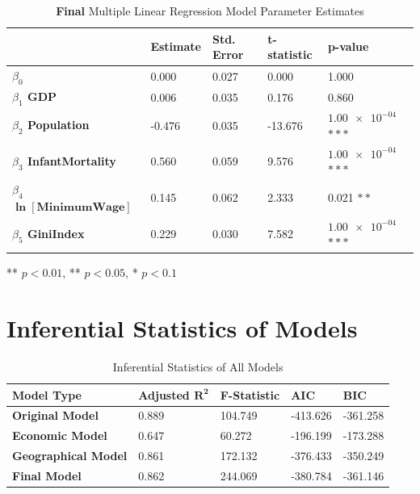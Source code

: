 \documentclass{article}
\begin{document}
\begin{appendices}
\begin{table}[H]
    \centering
        \begin{threeparttable}
            \begin{tabular}{l l l l l}
              \toprule & \textbf{Estimate} & \textbf{Std. Error} & \textbf{t-statistic} & \textbf{p-value} \\ \midrule
            \textbf{$\beta_0$} & 0.000 & 0.027 & 0.000 & 1.000 \\ 
            \textbf{$\beta_1$ GDP} & 0.006 & 0.035 & 0.176 & 0.860  \\ 
            \textbf{$\beta_2$ Population} & -0.476 & 0.035 & -13.676 & $\num{1.00e-04}$ $***$ \\ 
            \textbf{$\beta_3$ InfantMortality} & 0.560 & 0.059 & 9.576 & $\num{1.00e-04}$ $***$ \\ 
            \textbf{$\beta_4$ $\bm{\ln{[\text{MinimumWage}]}}$} & 0.145 & 0.062 & 2.333 & 0.021 $**$ \\ 
            \textbf{$\beta_5$ GiniIndex} & 0.229 & 0.030 & 7.582 & $\num{1.00e-04}$ $***$ \\ \bottomrule
            \end{tabular}
            \begin{tablenotes}
                \small
                \item *** $p < 0.01$, ** $p < 0.05$, * $p < 0.1$
            \end{tablenotes}
        \end{threeparttable}
    \caption{\label{table: descriptivestatsfinal}\textbf{Final} Multiple Linear Regression Model Parameter Estimates}
\end{table}

\section{Inferential Statistics of Models}
\begin{table}[H]
    \centering
        \begin{threeparttable}
            \begin{tabular}{l l l l l}
              \toprule \textbf{Model Type} & \textbf{Adjusted $\bm{R^2}$} & \textbf{F-Statistic} & \textbf{AIC} & \textbf{BIC} \\ \midrule
            \textbf{Original Model} & 0.889 & 104.749 & -413.626 & -361.258 \\ 
            \textbf{Economic Model} & 0.647 & 60.272 & -196.199 & -173.288  \\ 
            \textbf{Geographical Model} & 0.861 & 172.132 & -376.433 & -350.249 \\ 
            \textbf{Final Model} & 0.862 & 244.069 & -380.784 & -361.146 \\ \bottomrule
            \end{tabular}
        \end{threeparttable}
    \caption{\label{table: infstatsallmodel}Inferential Statistics of All Models}
\end{table}


\end{appendices}
\end{document}
